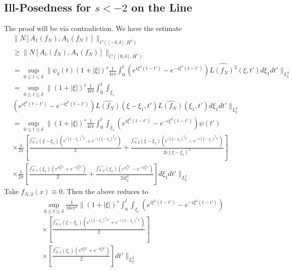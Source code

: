 \documentclass[12pt,reqno]{amsart}
\numberwithin{equation}{section}  %
\newcommand{\wh}{\widehat}
\begin{document}
\subsection{Ill-Posedness for $s < -2$ on the Line} 
\label{realsec:ill-pos-line}
The proof will be via contradiction. We have the estimate
%
%
\begin{equation*}
\begin{split}
  & \| N[A_{1}(f_{N}), A_{1}(f_{N})] \|_{C([-\delta, \delta],
  H^{s})}
  \\
 & \ge
  \| N[A_{1}(f_{N}), A_{1}(f_{N})] \|_{C([0, \delta],
  H^{s})} 
  \\
  & = \sup_{0 \le t \le \delta} \| \psi_{\delta}(t) (1 + | \xi |)^{s}
  \frac{1}{4 i \pi} \int_{0}^{t} \left( e^{i\xi^{2}(t-t')} - e^{-i\xi^{2}(t-t')} \right)
  \wh{L(f_{N})^{2}}(\xi, t') d \xi_{1} dt' \|_{L^{2}_{\xi}}
  \\
  & = \sup_{0 \le t \le \delta} \| (1 + | \xi |)^{s} \frac{1}{4 i \pi} 
  \int_{0}^{t} \int_{\xi_{1}}
  \\
  & \left( e^{i\xi^{2}(t-t')} - e^{-i\xi^{2}(t-t')} \right)
  \wh{L(f_{N})}(\xi - \xi_{1}, t')\wh{L(f_{N})}(\xi_{1}, t') d
  \xi_{1} dt'
  \|_{L^{2}_{\xi}}
  \\
  & = \sup_{0 \le t \le \delta} \| (1 + | \xi |)^{s} \frac{1}{4 i \pi} 
  \int_{0}^{t} \int_{\xi_{1}} \left( e^{i\xi^{2}(t-t')} - e^{-i\xi^{2}(t-t')} \right)
  \psi(t')
  \\
  & \times \frac{1}{2 \pi} \left[ \frac{\wh{f_{N,1}}(\xi - \xi_{1})\left( e^{i(\xi - \xi_{1})^{2}t'} +
  e^{-i(\xi - \xi_{1})^{2}t'} \right)}{2} + \frac{\wh{f_{N,2}}(\xi - \xi_{1})\left(
  e^{i(\xi - \xi_{1})^{2}t'} - e^{-i(\xi - \xi_{1})^{2}t'}
  \right)}{2i(\xi - \xi_{1})^{2}} \right]
  \\
  & \times \frac{1}{2 \pi} \left[ \frac{\wh{f_{N,1}}(\xi_{1})\left( e^{i\xi_{1}^{2}t'} +
  e^{-i\xi_{1}^{2}t'} \right)}{2} + \frac{\wh{f_{N,2}}(\xi_{1})\left(
  e^{i\xi_{1}^{2}t'} - e^{-i\xi_{1}^{2}t'}
  \right)}{2 i \xi_{1}^{2}} \right] d \xi_{1} dt' \|_{L^{2}_{\xi}}
\end{split}
\end{equation*}
%
Take $f_{N,2}(x) \equiv 0$. Then the above reduces to
%
%
\begin{equation*}
\begin{split}
  & \sup_{0 \le t \le \delta} \frac{1}{16 i \pi^{2}}\| (1 + | \xi |)^{s}
  \int_{0}^{t} \int_{\xi_{1}} \left( e^{i\xi^{2}(t-t')} - e^{-i\xi^{2}(t-t')} \right)
  \\
  & \times \left[ \frac{\wh{f_{N,1}}(\xi - \xi_{1})\left( e^{i(\xi - \xi_{1})^{2}t'} +
  e^{-i(\xi - \xi_{1})^{2}t'} \right)}{2} \right ]
  \\
  & \times \left[ \frac{\wh{f_{N,1}}(\xi_{1})\left( e^{i\xi_{1}^{2}t'} +
  e^{-i\xi_{1}^{2}t'} \right)}{2}  \right]
  dt' \|_{L^{2}_{\xi}}
\end{split}
\end{equation*}
\end{document}
